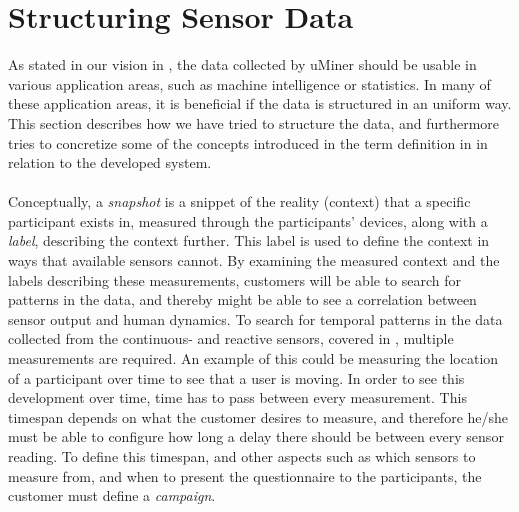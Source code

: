 
\section{Structuring Sensor Data}
\label{sec:modeling_sensor_data}

As stated in our vision in , the data collected by uMiner should be usable in various application areas, such as machine intelligence or statistics. In many of these application areas, it is beneficial if the data is structured in an uniform way. This section describes how we have tried to structure the data, and furthermore tries to concretize some of the concepts introduced in the term definition in  in relation to the developed system. 
\\\\
Conceptually, a \emph{snapshot} is a snippet of the reality (context) that a specific participant exists in, measured through the participants' devices, along with a \emph{label}, describing the context further. This label is used to define the context in ways that available sensors cannot. By examining the measured context and the labels describing these measurements, customers will be able to search for patterns in the data, and thereby might be able to see a correlation between sensor output and human dynamics. To search for temporal patterns in the data collected from the continuous- and reactive sensors, covered in , multiple measurements are required. An example of this could be measuring the location of a participant over time to see that a user is moving. In order to see this development over time, time has to pass between every measurement. This timespan depends on what the customer desires to measure, and therefore he/she must be able to configure how long a delay there should be between every sensor reading. To define this timespan, and other aspects such as which sensors to measure from, and when to present the questionnaire to the participants, the customer must define a \emph{campaign}.
\\\\
